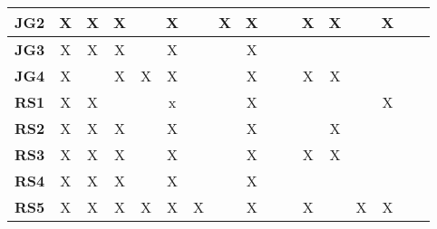 \documentclass[12pt]{article}
\begin{document}
\begin{table}[H]
\begin{adjustwidth}{-0.1in}{-1in}
{\begin{tabular}{c|c|c|c|c|c|c|c|c|c|c|c|c|c|c|c|c|}
\multicolumn{1}{|l|}{\textbf{JG2}}   &      X       &      X       &       X      &              &       X      &              &       X      &       X      &              &              &      X       &      X       &              &      X       &              &               \\ \hline
\multicolumn{1}{|l|}{\textbf{JG3}}   &      X       &      X       &       X      &              &       X      &              &              &       X      &              &              &              &              &              &              &              &               \\ \hline
\multicolumn{1}{|l|}{\textbf{JG4}}   &      X       &              &       X      &      X       &       X      &              &              &       X      &              &              &      X       &      X       &              &              &              &               \\ \hline
\multicolumn{1}{|l|}{\textbf{RS1}}   &      X       &      X       &              &              &       x      &              &              &       X      &              &              &              &              &              &      X       &              &               \\ \hline
\multicolumn{1}{|l|}{\textbf{RS2}}   &      X       &      X       &       X      &              &       X      &              &              &       X      &              &              &              &      X       &              &              &              &               \\ \hline
\multicolumn{1}{|l|}{\textbf{RS3}}   &      X       &      X       &       X      &              &       X      &              &              &       X      &              &              &      X       &      X       &              &              &              &               \\ \hline
\multicolumn{1}{|l|}{\textbf{RS4}}   &      X       &      X       &       X      &              &       X      &              &              &       X      &              &              &              &              &              &              &              &               \\ \hline
\multicolumn{1}{|l|}{\textbf{RS5}}   &      X       &      X       &       X      &      X       &       X      &      X       &              &       X      &              &              &      X       &              &      X       &      X       &              &               \\ \hline

\end{tabular}}
\end{adjustwidth}
\end{table}
\end{document}
